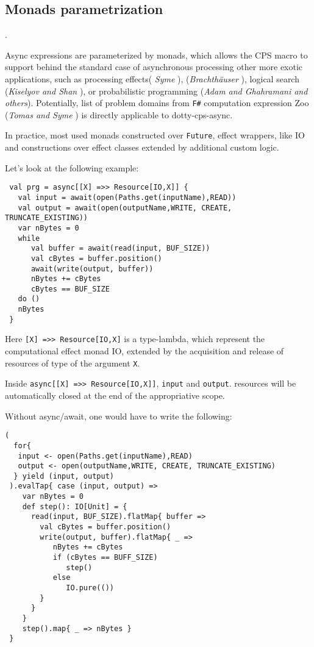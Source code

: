 \documentclass{llncs}
\begin{document}
\subsection{ Monads parametrization }. 
\label{MonadsParametrization}

  Async expressions are parameterized by monads, which allows the CPS macro to support behind the standard case of asynchronous processing other more exotic applications, such as processing effects( {\it Syme } \cite{10.1145/601775.601776}), ({\it Brachth{\"{a}}user} \cite{DBLP:journals/jfp/BrachthauserSO20}),  logical search  ({\it Kiselyov and Shan } \cite{10.1145/1090189.1086390}), or probabilistic programming ({\it Adam and Ghahramani and others}\cite{10.1145/2887747.2804317}). 
Potentially,  list of problem domains from \verb|F#| computation expression Zoo ({\it Tomas and Syme} \cite{computation-zoo-padl14}) is directly applicable to dotty-cps-async.

 In practice, most used monads constructed over \verb|Future|, effect wrappers, like IO and constructions over effect classes extended by additional custom logic.

Let's look at the following example:

\label{AACopyFile}
\begin{lstlisting}
 val prg = async[[X] =>> Resource[IO,X]] {
   val input = await(open(Paths.get(inputName),READ))
   val output = await(open(outputName,WRITE, CREATE, TRUNCATE_EXISTING))
   var nBytes = 0
   while
      val buffer = await(read(input, BUF_SIZE))
      val cBytes = buffer.position()
      await(write(output, buffer))
      nBytes += cBytes
      cBytes == BUF_SIZE
   do ()
   nBytes
 }
\end{lstlisting}

 Here \lstinline|[X] =>> Resource[IO,X]| is a type-lambda, which represent the computational effect monad IO,  extended by the acquisition and release of resources of type of the argument \lstinline|X|.   
    
  
 Inside \lstinline|async[[X] =>> Resource[IO,X]]|,  \lstinline|input| and \lstinline|output|. resources will be automatically closed at the end of the appropriative scope.

 Without async/await, one would have to write the following:

\begin{lstlisting}[basicstyle=\small]
 (
  for{
   input <- open(Paths.get(inputName),READ)
   output <- open(outputName,WRITE, CREATE, TRUNCATE_EXISTING)
  } yield (input, output)
 ).evalTap{ case (input, output) =>
    var nBytes = 0
    def step(): IO[Unit] = {
      read(input, BUF_SIZE).flatMap{ buffer =>
        val cBytes = buffer.position()
        write(output, buffer).flatMap{ _ =>
           nBytes += cBytes
           if (cBytes == BUFF_SIZE) 
              step()
           else
              IO.pure(())
        }
      }
    }
    step().map{ _ => nBytes }
 }
\end{lstlisting}
\end{document}
